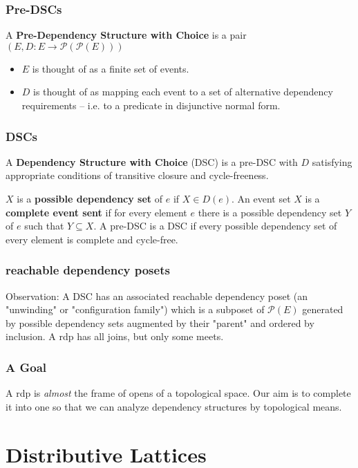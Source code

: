 \documentclass{beamer}
\newcommand{\Pc}{\mathcal{P}}
\begin{document}
\begin{frame}
\frametitle{Pre-DSCs}
\begin{definition}
A \textbf{Pre-Dependency Structure with Choice} is a pair \((E, D : E \rightarrow \Pc(\Pc(E)))\) \end{definition}
\begin{itemize}
\item \(E\) is thought of as a finite set of events.
\item \(D\) is thought of as mapping each event to a set of alternative dependency requirements -- i.e. to a predicate in disjunctive normal form.
\end{itemize}
\end{frame}


\begin{frame}
\frametitle{DSCs}
\begin{definition}
A \textbf{Dependency Structure with Choice} (DSC) is a pre-DSC with \(D\) satisfying appropriate conditions of transitive closure and cycle-freeness. 
\end{definition}
\(X\) is a \textbf{possible dependency set} of \(e\) if \(X \in D(e)\). An event set \(X\) is a \textbf{complete event sent} if for every element \(e\) there is a possible dependency set \(Y\) of \(e\) such that \(Y \subseteq X\). A pre-DSC is a DSC if every possible dependency set of every element is complete and cycle-free.
\end{frame}	

\begin{frame}
\frametitle{reachable dependency posets}
Observation: A DSC has an associated reachable dependency poset (an "unwinding" or "configuration family") which is a subposet of \(\Pc(E)\) generated by possible dependency sets augmented by their "parent" and ordered by inclusion. A rdp has all joins, but only some meets.

\end{frame}

\begin{frame}
\frametitle{A Goal}
A rdp is \textit{almost} the frame of opens of a topological space. Our aim is to complete it into one so that we can analyze dependency structures by topological means.
\end{frame}

\section{Distributive Lattices}
\end{document}
